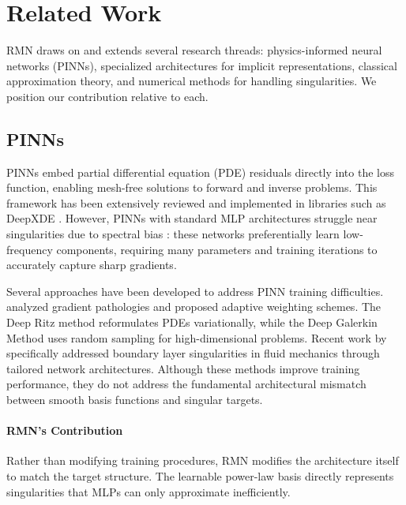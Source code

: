\documentclass[twoside,11pt]{article}
\begin{document}
\section{Related Work}
\label{sec:related_work}

RMN draws on and extends several research threads: physics-informed neural networks (PINNs), specialized architectures for implicit representations, classical approximation theory, and numerical methods for handling singularities. We position our contribution relative to each.

\subsection{PINNs}

PINNs \citep{raissi2019physics} embed partial differential equation (PDE) residuals directly into the loss function, enabling mesh-free solutions to forward and inverse problems. This framework has been extensively reviewed \citep{karniadakis2021physics, cuomo2022scientific} and implemented in libraries such as DeepXDE \citep{lu2021deepxde}. However, PINNs with standard MLP architectures struggle near singularities due to spectral bias \citep{rahaman2019spectral}: these networks preferentially learn low-frequency components, requiring many parameters and training iterations to accurately capture sharp gradients.

Several approaches have been developed to address PINN training difficulties. \citet{wang2021understanding} analyzed gradient pathologies and proposed adaptive weighting schemes. The Deep Ritz method \citep{weinan2018deep} reformulates PDEs variationally, while the Deep Galerkin Method \citep{sirignano2018dgm} uses random sampling for high-dimensional problems. Recent work by \citet{arzani2023theory} specifically addressed boundary layer singularities in fluid mechanics through tailored network architectures. Although these methods improve training performance, they do not address the fundamental architectural mismatch between smooth basis functions and singular targets.

\paragraph{RMN's Contribution} Rather than modifying training procedures, RMN modifies the architecture itself to match the target structure. The learnable power-law basis directly represents singularities that MLPs can only approximate inefficiently.
\end{document}
